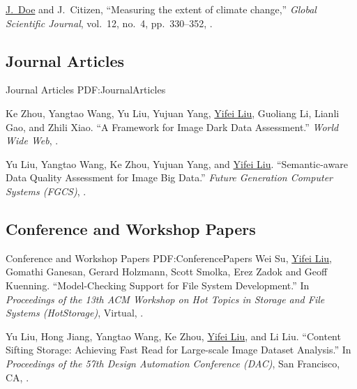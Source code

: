 \documentclass[letterpaper,10pt,oneside]{article}
\begin{document}
\begin{body}
\Gap
\NumberedItem{{\CharSpace}[1]}
{\underline{J.~Doe} and J.~Citizen,
``Measuring the extent of climate change,''
\textit{Global Scientific Journal},
vol.~12,
no.~4,
pp.~330--352,
.}
\fi


\subsection
{Journal Articles}
{Journal Articles}
{PDF:JournalArticles}
\GapNoBreak

\NumberedItem{[1]}
Ke Zhou, Yangtao Wang, Yu Liu, Yujuan Yang, \underline{Yifei Liu}, Guoliang Li, Lianli Gao, and Zhili Xiao.
``A Framework for Image Dark Data Assessment.'' 
\textit{World Wide Web},
.

\BigGap
\NumberedItem{[2]}
Yu Liu, Yangtao Wang, Ke Zhou, Yujuan Yang, and \underline{Yifei Liu}.
``Semantic-aware Data Quality Assessment for Image Big Data.'' 
\textit{Future Generation Computer Systems (FGCS)},
.
\BigGap
\GapNoBreak

\subsection
{Conference and Workshop Papers}
{Conference and Workshop Papers}
{PDF:ConferencePapers}
\GapNoBreak
\NumberedItem{[1]}
Wei Su, \underline{Yifei Liu}, Gomathi Ganesan, Gerard Holzmann, Scott Smolka, Erez Zadok and Geoff Kuenning.
``Model-Checking Support for File System Development.''
In \textit{Proceedings of the 13th ACM Workshop on Hot Topics in Storage and File Systems (HotStorage)}, Virtual,
.

\BigGap
\NumberedItem{[2]}
Yu Liu, Hong Jiang, Yangtao Wang, Ke Zhou, \underline{Yifei Liu}, and Li Liu.
``Content Sifting Storage: Achieving Fast Read for Large-scale Image Dataset Analysis.''
In \textit{Proceedings of the 57th Design Automation Conference (DAC)}, San Francisco, CA,
.


\end{body}
\end{document}
